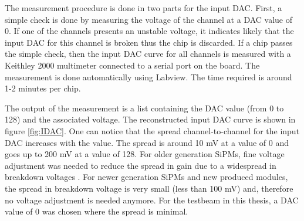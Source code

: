 The measurement procedure is done in two parts for the input DAC. First, a simple check is done by measuring the voltage of the channel at a DAC value of 0. If one of the channels presents an unstable voltage, it indicates likely that the input DAC for this channel is broken thus the chip is discarded. If a chip passes the simple check, then the input DAC curve for all channels is measured with a Keithley 2000 multimeter connected to a serial port on the board. The measurement is done automatically using Labview. The time required is around 1-2 minutes per chip.

The output of the measurement is a list containing the DAC value (from 0 to 128) and the associated voltage. The reconstructed input DAC curve is shown in figure \ref{fig:IDAC}. One can notice that the spread channel-to-channel for the input DAC increases with the value. The spread is around 10 mV at a value of 0 and goes up to 200 mV at a value of 128. For older generation SiPMs, fine voltage adjustment was needed to reduce the spread in gain due to a widespread in breakdown voltages \cite{Hartbrich2012}. For newer generation SiPMs and new produced modules, the spread in breakdown voltage is very small (less than 100 mV) and, therefore no voltage adjustment is needed anymore. For the testbeam in this thesis, a DAC value of 0 was chosen where the spread is minimal.

